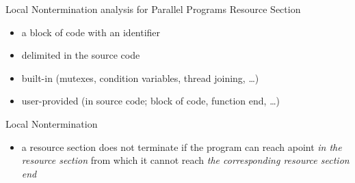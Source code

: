 \documentclass[aspectratio=169, fi]{paradise-slide}
\begin{document}
\begin{frame}[fragile]{Local Nontermination analysis for Parallel Programs}
    Resource Section
    \begin{itemize}
      \item a block of code with an identifier
      \item delimited in the source code
      \item built-in (mutexes, condition variables, thread joining, …)
      \item user-provided (in source code; block of code, function end, …)
    \end{itemize}
    \pause

    \bigskip
    Local Nontermination
    \begin{itemize}
      \item a resource section does not terminate if the program can reach apoint \emph{in the
        resource section} from which it cannot reach \emph{the corresponding resource section end}
    \end{itemize}
    \pause


\end{frame}
\end{document}
